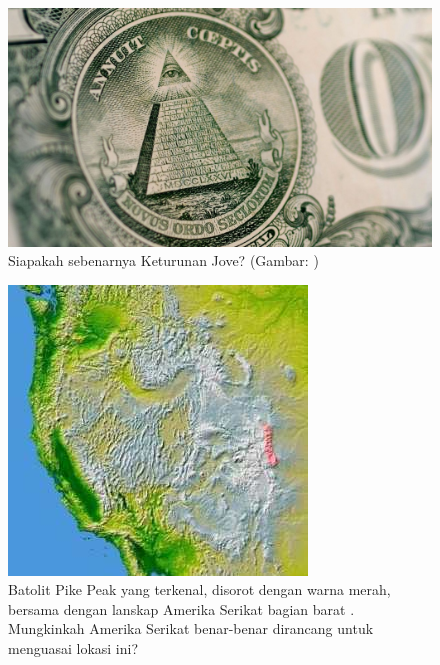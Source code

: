 \documentclass[10pt,twocolumn,letterpaper]{article}
\begin{document}
\begin{figure}[t]
\begin{center}
   \includegraphics[width=1\linewidth]{illuminati.jpg}
\end{center}
   \caption{Siapakah sebenarnya Keturunan Jove? (Gambar: \cite{35})}
\label{fig:10}
\label{fig:onecol}
\end{figure}

\begin{figure}[t]

\begin{center}
   \includegraphics[width=1\linewidth]{pike.jpg}
\end{center}
   \caption{Batolit Pike Peak yang terkenal, disorot dengan warna merah, bersama dengan lanskap Amerika Serikat bagian barat \cite{36}. Mungkinkah Amerika Serikat benar-benar dirancang untuk menguasai lokasi ini?}
\label{fig:11}
\label{fig:onecol}
\end{figure}
\end{document}
